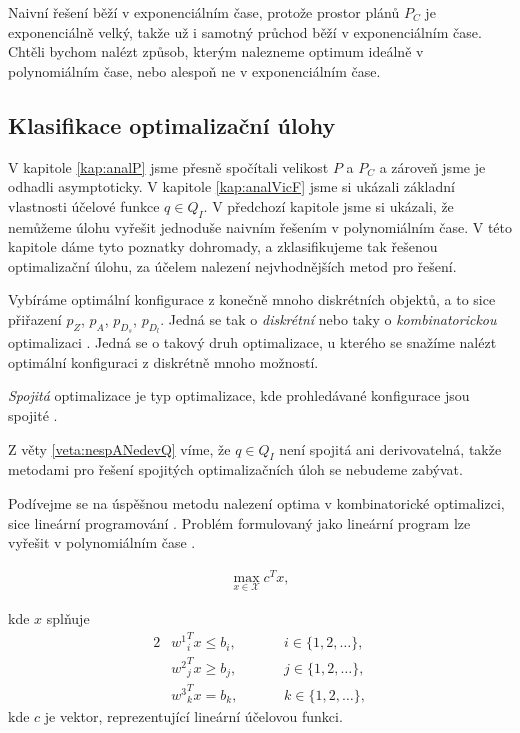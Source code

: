 Naivní řešení běží v exponenciálním čase, protože prostor plánů $P_C$ je exponenciálně velký, takže už i samotný průchod běží v exponenciálním čase.
Chtěli bychom nalézt způsob, kterým nalezneme optimum ideálně v polynomiálním čase, nebo alespoň ne v exponenciálním čase.

\subsection{Klasifikace optimalizační úlohy}\label{kap:NP}

V kapitole \ref{kap:analP} jsme přesně spočítali velikost $P$ a $P_C$ a zároveň jsme je odhadli asymptoticky.
V kapitole \ref{kap:analVicF} jsme si ukázali základní vlastnosti účelové funkce $q \in Q_I$.
V předchozí kapitole jsme si ukázali, že nemůžeme úlohu vyřešit jednoduše naivním řešením v polynomiálním čase.
V této kapitole dáme tyto poznatky dohromady, a zklasifikujeme tak řešenou optimalizační úlohu, za účelem nalezení nejvhodnějších metod pro řešení.

Vybíráme optimální konfigurace z konečně mnoho diskrétních objektů, a to sice přiřazení $p_Z$, $p_A$, $p_{D_{s}}$, $p_{D_{l}}$.
Jedná se tak o \textit{diskrétní} nebo taky o \textit{kombinatorickou} optimalizaci \cite{discrete}.
Jedná se o takový druh optimalizace, u kterého se snažíme nalézt optimální konfiguraci z diskrétně mnoho možností.

\textit{Spojitá} optimalizace je typ optimalizace, kde prohledávané konfigurace jsou spojité \cite{continuos}.

Z věty \ref{veta:nespANedevQ} víme, že $q \in Q_I$ není spojitá ani derivovatelná, takže metodami pro řešení spojitých optimalizačních úloh se nebudeme zabývat.

Podívejme se na úspěšnou metodu nalezení optima v kombinatorické optimalizci, sice lineární programování \cite{LP}.
Problém formulovaný jako lineární program lze vyřešit v polynomiálním čase \cite{cohen2020solving}.

\begin{definice}
  \begin{align*}
    \max_{x \in \mathcal{X}} c^T x,
  \end{align*}

  kde $x$ splňuje
  \begin{alignat*}{2}
    & {w^1}^T_i x \leq b_i, && \hspace{20pt} i \in \{ 1, 2, \dots \},\\
    & {w^2}^T_j x \geq b_j, && \hspace{20pt} j \in \{ 1, 2, \dots \},\\
    & {w^3}^T_k x = b_k,    && \hspace{20pt} k \in \{ 1, 2, \dots \},
  \end{alignat*}
  kde $c$ je vektor, reprezentující lineární účelovou funkci.
\end{definice}

